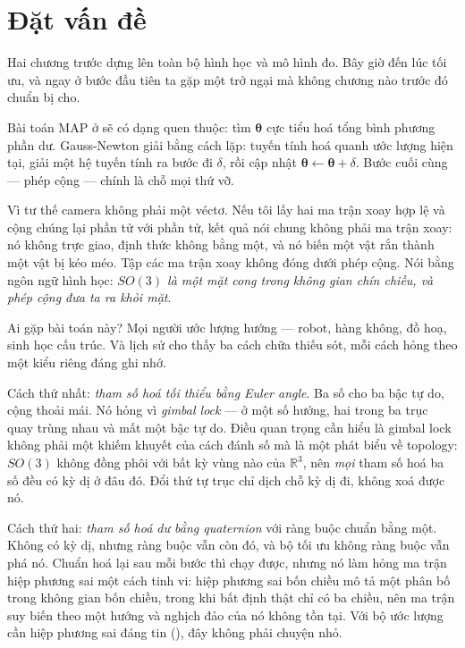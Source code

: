 \documentclass[../../vslam.tex]{subfiles}
\begin{document}
\section{Đặt vấn đề}

Hai chương trước dựng lên toàn bộ hình học và mô hình đo. Bây giờ đến lúc tối ưu, và ngay ở bước đầu tiên ta gặp một trở ngại mà không chương nào trước đó chuẩn bị cho.

Bài toán MAP ở  sẽ có dạng quen thuộc: tìm \(\boldsymbol{\theta}\) cực tiểu hoá tổng bình phương phần dư. Gauss-Newton giải bằng cách lặp: tuyến tính hoá quanh ước lượng hiện tại, giải một hệ tuyến tính ra bước đi \(\delta\), rồi cập nhật \(\boldsymbol{\theta} \leftarrow \boldsymbol{\theta} + \delta\). Bước cuối cùng --- phép cộng --- chính là chỗ mọi thứ vỡ.

Vì tư thế camera không phải một véctơ. Nếu tôi lấy hai ma trận xoay hợp lệ và cộng chúng lại phần tử với phần tử, kết quả nói chung không phải ma trận xoay: nó không trực giao, định thức không bằng một, và nó biến một vật rắn thành một vật bị kéo méo. Tập các ma trận xoay không đóng dưới phép cộng. Nói bằng ngôn ngữ hình học: \emph{\(SO(3)\) là một mặt cong trong không gian chín chiều, và phép cộng đưa ta ra khỏi mặt}.

Ai gặp bài toán này? Mọi người ước lượng hướng --- robot, hàng không, đồ hoạ, sinh học cấu trúc. Và lịch sử cho thấy ba cách chữa thiếu sót, mỗi cách hỏng theo một kiểu riêng đáng ghi nhớ.

Cách thứ nhất: \emph{tham số hoá tối thiểu bằng Euler angle}. Ba số cho ba bậc tự do, cộng thoải mái. Nó hỏng vì \emph{gimbal lock} --- ở một số hướng, hai trong ba trục quay trùng nhau và mất một bậc tự do. Điều quan trọng cần hiểu là gimbal lock không phải một khiếm khuyết của cách đánh số mà là một phát biểu về topology: \(SO(3)\) không đồng phôi với bất kỳ vùng nào của \(\mathbb{R}^3\), nên \emph{mọi} tham số hoá ba số đều có kỳ dị ở đâu đó. Đổi thứ tự trục chỉ dịch chỗ kỳ dị đi, không xoá được nó.

Cách thứ hai: \emph{tham số hoá dư bằng quaternion} với ràng buộc chuẩn bằng một. Không có kỳ dị, nhưng ràng buộc vẫn còn đó, và bộ tối ưu không ràng buộc vẫn phá nó. Chuẩn hoá lại sau mỗi bước thì chạy được, nhưng nó làm hỏng ma trận hiệp phương sai một cách tinh vi: hiệp phương sai bốn chiều mô tả một phân bố trong không gian bốn chiều, trong khi bất định thật chỉ có ba chiều, nên ma trận suy biến theo một hướng và nghịch đảo của nó không tồn tại. Với bộ ước lượng cần hiệp phương sai đáng tin (), đây không phải chuyện nhỏ.
\end{document}
